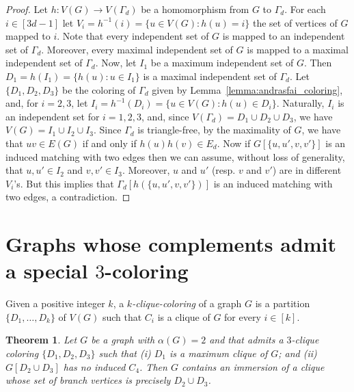 \documentclass[a4paper,12pt]{article}
\newtheorem{theorem}{Theorem}
\begin{document}
\begin{proof}
	Let \(h \colon V(G) \to V(\Gamma_d)\) be a homomorphism from \(G\) to \(\Gamma_d\).
	For each \(i\in [3d-1]\) let \(V_i = h^{-1}(i) = \{u\in V(G) : h(u) = i\}\)
	the set of vertices of \(G\) mapped to \(i\).
	Note that every independent set of \(G\) is mapped to an independent set of \(\Gamma_d\).
	Moreover, every maximal independent set of \(G\) is mapped to a maximal independent set of \(\Gamma_d\).
	Now, let \(I_1\) be a maximum independent set of \(G\).
	Then \(D_1 = h(I_1) = \{h(u) : u \in I_1\}\) is a maximal independent set of \(\Gamma_d\).
	Let \(\{D_1,D_2,D_3\}\) be the coloring of \(\Gamma_d\) given by Lemma~\ref{lemma:andrasfai_coloring},
	and, for \(i = 2,3\), let \(I_i = h^{-1}(D_i) = \{u \in V(G) : h(u) \in D_i\}\).
	Naturally, \(I_i\) is an independent set for \(i = 1,2,3\),
	and, since \(V(\Gamma_d) = D_1\cup D_2\cup D_3\),
	we have \(V(G) = I_1 \cup I_2 \cup I_3\).
	Since \(\Gamma_d\) is triangle-free,
	by the maximality of \(G\), 
	we have that \(uv\in E(G)\) if and only if \(h(u)h(v)\in E_d\).
	Now if \(G[\{u,u',v,v'\}]\) is an induced matching with two edges
	then we can assume, without loss of generality,
	that \(u,u' \in I_2\) and \(v,v'\in I_3\).
	Moreover, \(u\) and \(u'\) (resp. \(v\) and \(v'\)) are in different \(V_i\)'s.
	But this implies that \(\Gamma_d[h(\{u,u',v,v'\})]\) is an induced matching with two edges,
	a contradiction.
\end{proof}


\section{Graphs whose complements admit a special \(3\)-coloring}

\newcommand{\Gcompl}{\overline{G}}

Given a positive integer \(k\),
a \emph{\(k\)-clique-coloring} of a graph \(G\) is a partition \(\{D_1,\ldots, D_k\}\) of \(V(G)\)
such that \(C_i\) is a clique of \(G\) for every \(i\in[k]\).

\begin{theorem}\label{thm:graphs_with_special_clique_coloring}
	Let \(G\) be a graph with \(\alpha(G) = 2\)
	and that admits a \(3\)-clique coloring \(\{D_1,D_2,D_3\}\) such that
	(i) \(D_1\) is a maximum clique of \(G\); and
	(ii) \(G[D_2\cup D_3]\) has no induced \(C_4\).
	Then \(G\) contains an immersion of a clique whose set of branch vertices is precisely \(D_2\cup D_3\).
\end{theorem}
\end{document}
